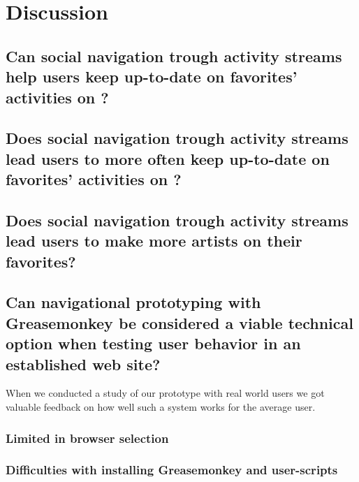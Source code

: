 \clearpage
\clearpage

\section{Discussion}

\subsection{%
  Can social navigation trough activity streams help users keep
  up-to-date on favorites' activities on \urort{}?
}

\subsection{%
  Does social navigation trough activity streams lead users to more often keep
  up-to-date on favorites' activities on \urort{}?
}

\subsection{%
  Does social navigation trough activity streams lead users to make
  more artists on \urort{} their favorites?
}

\subsection{%
  Can navigational prototyping with Greasemonkey be considered a
  viable technical option when testing user behavior in an
  established web site?
}

When we conducted a study of our prototype with real world users
we got valuable feedback on how well such a system works for the average user.

\subsubsection{Limited in browser selection}


\subsubsection{Difficulties with installing Greasemonkey and user-scripts}

